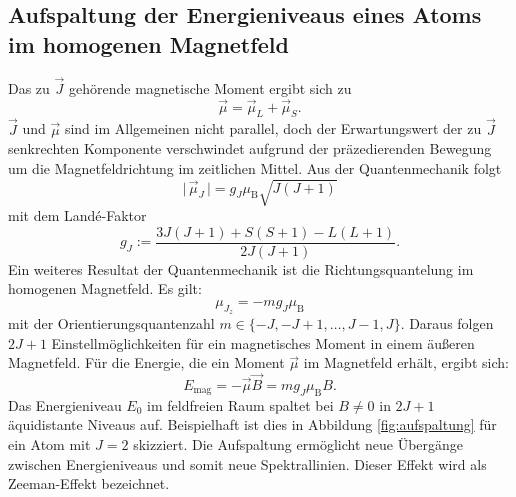 \documentclass[
  bibliography=totoc,     %
  captions=tableheading,  %
  titlepage=firstiscover, %
]{scrartcl}
\begin{document}
\subsection{Aufspaltung der Energieniveaus eines Atoms im homogenen Magnetfeld}
%
Das zu $\vec{J}$ gehörende magnetische Moment ergibt sich zu
%
\begin{equation}
    \vec{\mu}=\vec{\mu}_L+\vec{\mu}_S.
\end{equation}
%
$\vec{J}$ und $\vec{\mu}$ sind im Allgemeinen nicht parallel, doch der
Erwartungswert der zu $\vec{J}$ senkrechten Komponente verschwindet aufgrund
der präzedierenden Bewegung um die Magnetfeldrichtung im zeitlichen Mittel.
Aus der Quantenmechanik folgt
%
\begin{equation}
     \lvert\,\vec{\mu}_J\,\rvert=g_J\mu_{\mathup{B}}\sqrt{J(J+1)}
\end{equation}
%
mit dem Landé-Faktor
%
\begin{equation}
    g_J:=\frac{3J(J+1)+S(S+1)-L(L+1)}{2J(J+1)}.
    \label{eq:g_J}
\end{equation}
%
Ein weiteres Resultat der Quantenmechanik ist die Richtungsquantelung im
homogenen Magnetfeld. Es gilt:
%
\begin{equation}
    \mu_{J_z}=-mg_J\mu_{\mathup{B}}
\end{equation}
%
mit der Orientierungsquantenzahl $m\in\{-J,-J+1,\ldots,J-1,J\}$.
Daraus folgen $2J+1$ Einstellmöglichkeiten für ein magnetisches Moment in einem
äußeren Magnetfeld. Für die Energie, die ein Moment $\vec{\mu}$ im Magnetfeld
erhält, ergibt sich:
%
\begin{equation}
    E_{\mathup{mag}}=-\vec{\mu}\vec{B}=mg_J\mu_{\mathup{B}}B.
    \label{eq:E_mag}
\end{equation}
%
Das Energieniveau $E_0$ im feldfreien Raum spaltet bei $B\neq0$ in $2J+1$
äquidistante Niveaus auf. Beispielhaft ist dies in Abbildung
\ref{fig:aufspaltung} für ein Atom mit $J=2$ skizziert. Die Aufspaltung
ermöglicht neue Übergänge zwischen Energieniveaus und somit neue Spektrallinien.
Dieser Effekt wird als Zeeman-Effekt bezeichnet.
%
\end{document}
